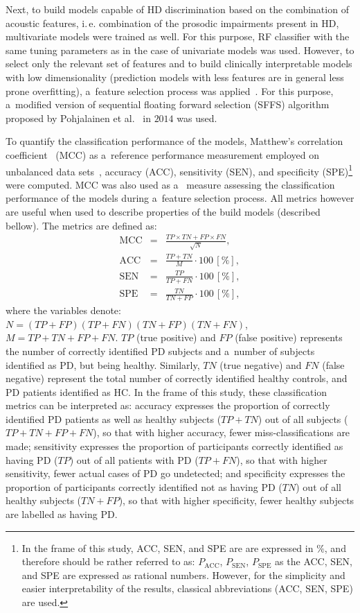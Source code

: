 Next, to build models capable of HD discrimination based on the combination of acoustic features, i.\,e. combination of the prosodic impairments present in HD, multivariate models were trained as well. For this purpose, RF classifier with the same tuning parameters as in the case of univariate models was used. However, to select only the relevant set of features and to build clinically interpretable models with low dimensionality (prediction models with less features are in general less prone overfitting), a~feature selection process was applied~\cite{Guyon2006}. For this purpose, a~modified version of sequential floating forward selection (SFFS) algorithm proposed by Pohjalainen et al.~\cite{Pohjalainen2014} in $2014$ was used.

To quantify the classification performance of the models, Matthew's correlation coefficient~\cite{Matthews1975} (MCC) as a~reference performance measurement employed on unbalanced data sets~\cite{Jurman2012}, accuracy (ACC), sensitivity (SEN), and specificity (SPE)\footnote{In the frame of this study, ACC, SEN, and SPE are are expressed in $\%$, and therefore should be rather referred to as: $P_\mathrm{ACC}$, $P_\mathrm{SEN}$, $P_\mathrm{SPE}$ as the ACC, SEN, and SPE are expressed as rational numbers. However, for the simplicity and easier interpretability of the results, classical abbreviations (ACC, SEN, SPE) are used.} were computed. MCC was also used as a~ measure assessing the classification performance of the models during a~feature selection process. All metrics however are useful when used to describe properties of the build models (described bellow). The metrics are defined as:
\begin{eqnarray}
	\mathrm{MCC} &=& \frac{TP \times TN + FP \times FN}{\sqrt{N}}, \\
	\mathrm{ACC} &=& \frac{TP + TN}{M} \cdot 100\,[\%], \\
	\mathrm{SEN} &=& \frac{TP}{TP + FN} \cdot 100\,[\%], \\
	\mathrm{SPE} &=& \frac{TN}{TN + FP} \cdot 100\,[\%],
\end{eqnarray}
where the variables denote: $N = (TP + FP)(TP + FN)(TN + FP)(TN + FN)$, $M = TP + TN + FP + FN$. $TP$ (true positive) and $FP$ (false positive) represents the number of correctly identified PD subjects and a~number of subjects identified as PD, but being healthy. Similarly, $TN$ (true negative) and $FN$ (false negative) represent the total number of correctly identified healthy controls, and PD patients identified as HC. In the frame of this study, these classification metrics can be interpreted as: accuracy expresses the proportion of correctly identified PD patients as well as healthy subjects ($TP + TN$) out of all subjects ($TP + TN + FP + FN$), so that with higher accuracy, fewer miss-classifications are made; sensitivity expresses the proportion of participants correctly identified as having PD ($TP$) out of all patients with PD ($TP + FN$), so that with higher sensitivity, fewer actual cases of PD go undetected; and specificity expresses the proportion of participants correctly identified not as having PD ($TN$) out of all healthy subjects ($TN + FP$), so that with higher specificity, fewer healthy subjects are labelled as having PD.

